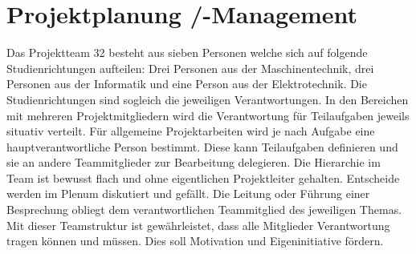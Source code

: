 \section{Projektplanung /-Management}
	Das Projektteam 32 besteht aus sieben Personen welche sich auf folgende Studienrichtungen aufteilen: 
	Drei Personen aus der Maschinentechnik, drei Personen aus der Informatik und eine Person aus der Elektrotechnik. 
	Die Studienrichtungen sind sogleich die jeweiligen Verantwortungen. In den Bereichen mit mehreren Projektmitgliedern wird die Verantwortung 
	für Teilaufgaben jeweils situativ verteilt. Für allgemeine Projektarbeiten wird je nach Aufgabe eine hauptverantwortliche Person bestimmt. 
	Diese kann Teilaufgaben definieren und sie an andere Teammitglieder zur Bearbeitung delegieren. 
	Die Hierarchie im Team ist bewusst flach und ohne eigentlichen Projektleiter gehalten. 
	Entscheide werden im Plenum diskutiert und gefällt. Die Leitung oder Führung einer Besprechung obliegt dem verantwortlichen Teammitglied  des jeweiligen Themas.
	Mit dieser Teamstruktur ist gewährleistet, dass alle Mitglieder Verantwortung tragen können und müssen. Dies soll Motivation und Eigeninitiative fördern.